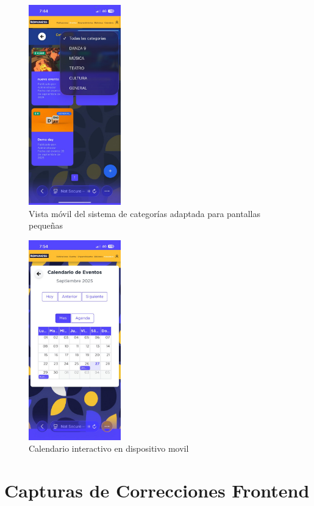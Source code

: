 \begin{figure}[H]
  \centering
  \includegraphics[width=4cm,keepaspectratio]{project/images/imagen13.jpg}
  \caption{Vista móvil del sistema de categorías adaptada para pantallas pequeñas}
  \label{fig:resp-movil}
\end{figure}

\begin{figure}[H]
  \centering
  \includegraphics[width=4cm,keepaspectratio]{project/images/imagen14.jpg}
  \caption{Calendario interactivo en dispositivo movil}
  \label{fig:resp-tablet}
\end{figure}

\section{Capturas de Correcciones Frontend}

